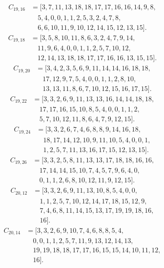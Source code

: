 \documentclass[11pt,a4paper]{article}
\theoremstyle{definition}\newtheorem{definition}[theorem]{Definition}
\theoremstyle{remark}\newtheorem{remark}[theorem]{Remark}
\begin{document}
\[\begin{aligned}
C_{19,16}&=[3,7,11,13,18,18,17,17,16,16,14,9,8,\\
&\quad 5,4,0,0,1,1,2,5,3,2,4,7,8,\\
&\quad 6,6,10,11,9,10,12,14,15,12,13,15].
\end{aligned}\]
\[\begin{aligned}
C_{19,18}&=[3,5,8,10,11,8,6,3,2,4,7,9,14,\\
&\quad 11,9,6,4,0,0,1,1,2,5,7,10,12,\\
&\quad 12,14,13,18,18,17,17,16,16,13,15,15].
\end{aligned}\]
\[\begin{aligned}
C_{19,20}&=[3,4,2,3,5,6,9,11,14,14,16,18,18,\\
&\quad 17,12,9,7,5,4,0,0,1,1,2,8,10,\\
&\quad 13,13,11,8,6,7,10,12,15,16,17,15].
\end{aligned}\]
\[\begin{aligned}
C_{19,22}&=[3,3,2,6,9,11,13,13,16,14,14,18,18,\\
&\quad 17,17,16,15,10,8,5,4,0,0,1,1,2,\\
&\quad 5,7,10,12,11,8,6,4,7,9,12,15].
\end{aligned}\]
\[\begin{aligned}
C_{19,24}&=[3,3,2,6,7,4,6,8,8,9,14,16,18,\\
&\quad 18,17,14,12,10,9,11,10,5,4,0,0,1,\\
&\quad 1,2,5,7,11,13,16,17,15,12,13,15].
\end{aligned}\]
\[\begin{aligned}
C_{19,26}&=[3,3,2,5,8,11,13,13,17,18,18,16,16,\\
&\quad 17,14,14,15,10,7,4,5,7,9,6,4,0,\\
&\quad 0,1,1,2,6,8,10,12,11,9,12,15].
\end{aligned}\]
\[\begin{aligned}
C_{20,12}&=[3,3,2,6,9,11,13,10,8,5,4,0,0,\\
&\quad 1,1,2,5,7,10,12,14,17,18,15,12,9,\\
&\quad 7,4,6,8,11,14,15,13,17,19,19,18,16,\\
&\quad 16].
\end{aligned}\]
\[\begin{aligned}
C_{20,14}&=[3,3,2,6,9,10,7,4,6,8,8,5,4,\\
&\quad 0,0,1,1,2,5,7,11,9,13,12,14,13,\\
&\quad 19,19,18,18,17,17,16,15,15,14,10,11,12,\\
&\quad 16].
\end{aligned}\]
\end{document}

